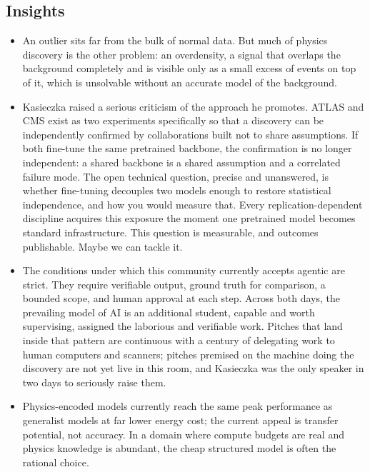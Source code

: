 \documentclass[11pt]{article}
\begin{document}
\subsection*{Insights}
\begin{itemize}
    \item An outlier sits far from the bulk of normal data. But much of physics discovery is the other problem: an overdensity, a signal that overlaps the background completely and is visible only as a small excess of events on top of it, which is unsolvable without an accurate model of the background.
    \item Kasieczka raised a serious criticism of the approach he promotes. ATLAS and CMS exist as two experiments specifically so that a discovery can be independently confirmed by collaborations built not to share assumptions. If both fine-tune the same pretrained backbone, the confirmation is no longer independent: a shared backbone is a shared assumption and a correlated failure mode. The open technical question, precise and unanswered, is whether fine-tuning decouples two models enough to restore statistical independence, and how you would measure that. Every replication-dependent discipline acquires this exposure the moment one pretrained model becomes standard infrastructure. This question is measurable, and outcomes publishable. Maybe we can tackle it.
    \item The conditions under which this community currently accepts agentic are strict. They require verifiable output, ground truth for comparison, a bounded scope, and human approval at each step. Across both days, the prevailing model of AI is an additional student, capable and worth supervising, assigned the laborious and verifiable work. Pitches that land inside that pattern are continuous with a century of delegating work to human computers and scanners; pitches premised on the machine doing the discovery are not yet live in this room, and Kasieczka was the only speaker in two days to seriously raise them.
    \item Physics-encoded models currently reach the same peak performance as generalist models at far lower energy cost; the current appeal is transfer potential, not accuracy. In a domain where compute budgets are real and physics knowledge is abundant, the cheap structured model is often the rational choice.
\end{itemize}
\end{document}
